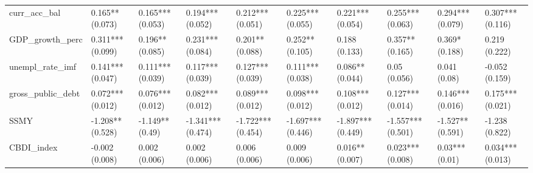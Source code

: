 \begin{table}[ht]
\begin{tabular}{llllllllll}
  curr\_acc\_bal & 0.165** (0.073) & 0.165*** (0.053) & 0.194*** (0.052) & 0.212*** (0.051) & 0.225*** (0.055) & 0.221*** (0.054) & 0.255*** (0.063) & 0.294*** (0.079) & 0.307*** (0.116) \\ 
  GDP\_growth\_perc & 0.311*** (0.099) & 0.196** (0.085) & 0.231*** (0.084) & 0.201** (0.088) & 0.252** (0.105) & 0.188 (0.133) & 0.357** (0.165) & 0.369* (0.188) & 0.219 (0.222) \\ 
  unempl\_rate\_imf & 0.141*** (0.047) & 0.111*** (0.039) & 0.117*** (0.039) & 0.127*** (0.039) & 0.111*** (0.038) & 0.086** (0.044) & 0.05 (0.056) & 0.041 (0.08) & -0.052 (0.159) \\ 
  gross\_public\_debt & 0.072*** (0.012) & 0.076*** (0.012) & 0.082*** (0.012) & 0.089*** (0.012) & 0.098*** (0.012) & 0.108*** (0.012) & 0.127*** (0.014) & 0.146*** (0.016) & 0.175*** (0.021) \\ 
  SSMY & -1.208** (0.528) & -1.149** (0.49) & -1.341*** (0.474) & -1.722*** (0.454) & -1.697*** (0.446) & -1.897*** (0.449) & -1.557*** (0.501) & -1.527** (0.591) & -1.238 (0.822) \\ 
  CBDI\_index & -0.002 (0.008) & 0.002 (0.006) & 0.002 (0.006) & 0.006 (0.006) & 0.009 (0.006) & 0.016** (0.007) & 0.023*** (0.008) & 0.03*** (0.01) & 0.034*** (0.013) \\ 
   \bottomrule
\end{tabular}
\endgroup
\end{table}
